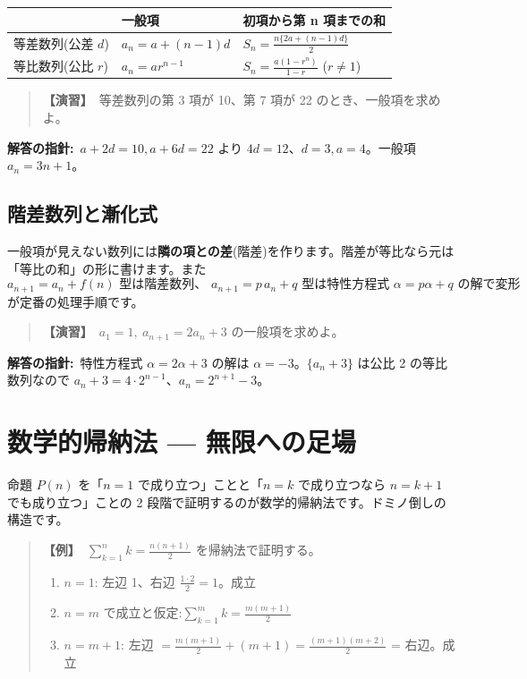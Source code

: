 \documentclass{article}
\begin{document}
\begin{center}
\begin{tabular}{|l|l|l|}
\hline
 & 一般項 & 初項から第 n 項までの和 \\
\hline
等差数列(公差 \(d\)) & \(a_n = a + (n-1)d\) & \(S_n = \frac{n\{2a + (n-1)d\}}{2}\) \\
等比数列(公比 \(r\)) & \(a_n = ar^{n-1}\) & \(S_n = \frac{a(1 - r^n)}{1 - r}\) (\(r \neq 1\)) \\
\hline
\end{tabular}
\end{center}

\begin{quote}
\textbf{【演習】}\ 等差数列の第 3 項が 10、第 7 項が 22 のとき、一般項を求めよ。
\end{quote}

\textbf{解答の指針:}\ \(a + 2d = 10, a + 6d = 22\) より \(4d = 12\)、\(d = 3, a = 4\)。一般項 \(a_n = 3n + 1\)。

\subsection{階差数列と漸化式}

一般項が見えない数列には\textbf{隣の項との差}(階差)を作ります。階差が等比なら元は「等比の和」の形に書けます。また
\[ a_{n+1} = a_n + f(n) \text{ 型は階差数列、 } a_{n+1} = p\,a_n + q \text{ 型は特性方程式 } \alpha = p\alpha + q \text{ の解で変形} \]
が定番の処理手順です。

\begin{quote}
\textbf{【演習】}\ \(a_1 = 1,\ a_{n+1} = 2a_n + 3\) の一般項を求めよ。
\end{quote}

\textbf{解答の指針:}\ 特性方程式 \(\alpha = 2\alpha + 3\) の解は \(\alpha = -3\)。\(\{a_n + 3\}\) は公比 2 の等比数列なので \(a_n + 3 = 4 \cdot 2^{n-1}\)、\(a_n = 2^{n+1} - 3\)。

\section{数学的帰納法 — 無限への足場}

命題 \(P(n)\) を「\(n = 1\) で成り立つ」ことと「\(n = k\) で成り立つなら \(n = k + 1\) でも成り立つ」ことの 2 段階で証明するのが数学的帰納法です。ドミノ倒しの構造です。

\begin{quote}
\textbf{【例】}\ \(\displaystyle \sum_{k=1}^{n} k = \frac{n(n+1)}{2}\) を帰納法で証明する。
\begin{enumerate}
\item \(n = 1\): 左辺 1、右辺 \(\frac{1 \cdot 2}{2} = 1\)。成立
\item \(n = m\) で成立と仮定:\(\sum_{k=1}^{m} k = \frac{m(m+1)}{2}\)
\item \(n = m+1\): 左辺 \(= \frac{m(m+1)}{2} + (m+1) = \frac{(m+1)(m+2)}{2}\) = 右辺。成立
\end{enumerate}
\end{quote}
\end{document}
